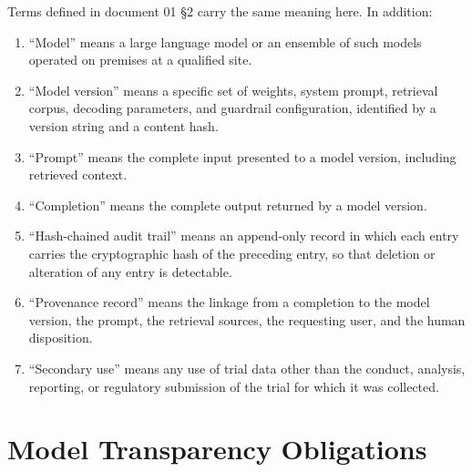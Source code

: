 Terms defined in document 01 §2 carry the same meaning here. In addition:

\begin{enumerate}
\item ``Model'' means a large language model or an ensemble of such models
  operated on premises at a qualified site.

\item ``Model version'' means a specific set of weights, system prompt,
  retrieval corpus, decoding parameters, and guardrail configuration, identified
  by a version string and a content hash.

\item ``Prompt'' means the complete input presented to a model version,
  including retrieved context.

\item ``Completion'' means the complete output returned by a model version.

\item ``Hash-chained audit trail'' means an append-only record in which each
  entry carries the cryptographic hash of the preceding entry, so that deletion
  or alteration of any entry is detectable.

\item ``Provenance record'' means the linkage from a completion to the model
  version, the prompt, the retrieval sources, the requesting user, and the human
  disposition.

\item ``Secondary use'' means any use of trial data other than the conduct,
  analysis, reporting, or regulatory submission of the trial for which it was
  collected.
\end{enumerate}

\section{Model Transparency Obligations}

